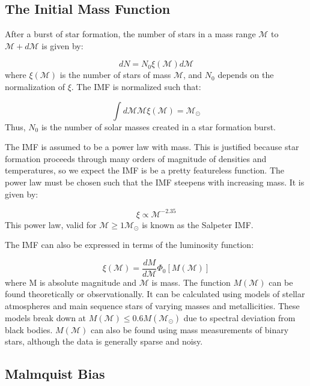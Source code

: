 \subsection{The Initial Mass Function}

After a burst of star formation, the number of stars in a mass range $\mathcal{M}$ to $\mathcal{M}+d\mathcal{M}$ is given by:

\begin{equation}
dN = N_0 \xi(\mathcal{M}) d\mathcal{M}
\end{equation}
where $\xi(\mathcal{M})$ is the number of stars of mass $\mathcal{M}$, and $N_0$ depends on the normalization of $\xi$. The IMF is normalized such that:

\begin{equation}
\int d\mathcal{M} \mathcal{M} \xi(\mathcal{M}) = \mathcal{M}_\odot
\end{equation}
Thus, $N_0$ is the number of solar masses created in a star formation burst. 

The IMF is assumed to be a power law with mass. This is justified because star formation proceeds through many orders of magnitude of densities and temperatures, so we expect the IMF is be a pretty featureless function. The power law must be chosen such that the IMF steepens with increasing mass. It is given by:

\begin{equation}
\xi  \propto \mathcal{M}^{-2.35}
\end{equation}
This power law, valid for $\mathcal{M} \geq 1\mathcal{M}_\odot$ is known as the Salpeter IMF.

The IMF can also be expressed in terms of the luminosity function:

\begin{equation}
\xi(\mathcal{M}) = \frac{dM}{d\mathcal{M}} \Phi_0 [M(\mathcal{M})]
\end{equation}
where M is absolute magnitude and $\mathcal{M}$ is mass. The function $M(\mathcal{M})$ can be found theoretically or observationally. It can be calculated using models of stellar atmospheres and main sequence stars of varying masses and metallicities. These models break down at $M(\mathcal{M}) \leq 0.6 M(\mathcal{M}_\odot)$ due to spectral deviation from black bodies. $M(\mathcal{M})$ can also be found using mass measurements of binary stars, although the data is generally sparse and noisy. 

\subsection{Malmquist Bias}

